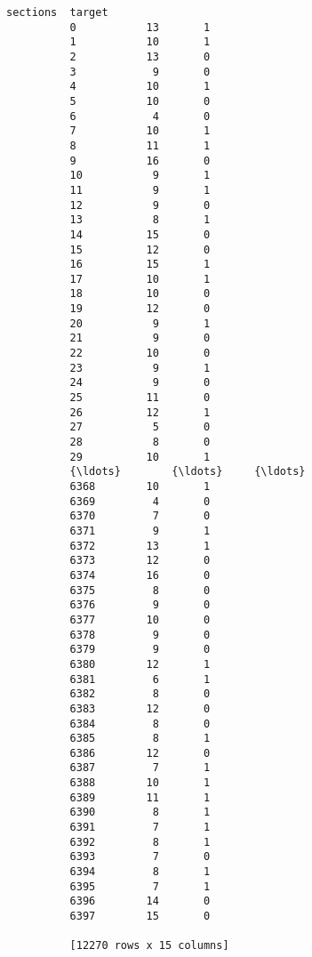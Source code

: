 \documentclass[11pt]{article}
\begin{document}
\begin{Verbatim}[commandchars=\\\{\}]
                sections  target  
          0           13       1  
          1           10       1  
          2           13       0  
          3            9       0  
          4           10       1  
          5           10       0  
          6            4       0  
          7           10       1  
          8           11       1  
          9           16       0  
          10           9       1  
          11           9       1  
          12           9       0  
          13           8       1  
          14          15       0  
          15          12       0  
          16          15       1  
          17          10       1  
          18          10       0  
          19          12       0  
          20           9       1  
          21           9       0  
          22          10       0  
          23           9       1  
          24           9       0  
          25          11       0  
          26          12       1  
          27           5       0  
          28           8       0  
          29          10       1  
          {\ldots}        {\ldots}     {\ldots}  
          6368        10       1  
          6369         4       0  
          6370         7       0  
          6371         9       1  
          6372        13       1  
          6373        12       0  
          6374        16       0  
          6375         8       0  
          6376         9       0  
          6377        10       0  
          6378         9       0  
          6379         9       0  
          6380        12       1  
          6381         6       1  
          6382         8       0  
          6383        12       0  
          6384         8       0  
          6385         8       1  
          6386        12       0  
          6387         7       1  
          6388        10       1  
          6389        11       1  
          6390         8       1  
          6391         7       1  
          6392         8       1  
          6393         7       0  
          6394         8       1  
          6395         7       1  
          6396        14       0  
          6397        15       0  
          
          [12270 rows x 15 columns]
\end{Verbatim}
            
\end{document}

